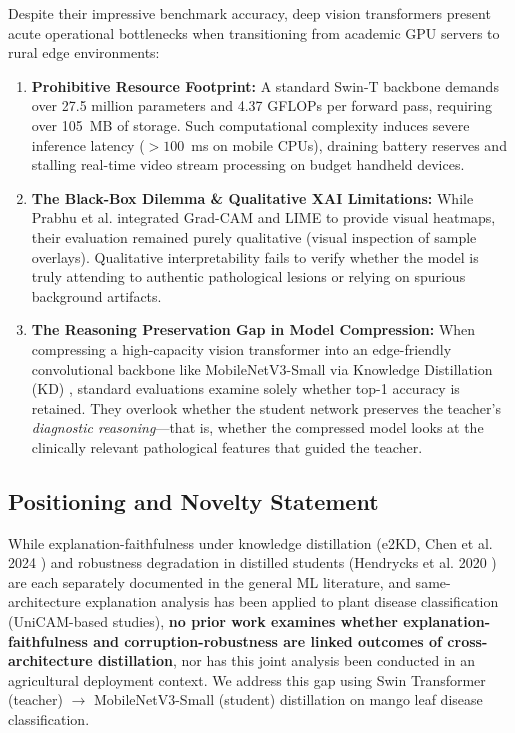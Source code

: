 \documentclass[journal,10pt,twocolumn]{article}
\begin{document}
Despite their impressive benchmark accuracy, deep vision transformers present acute operational bottlenecks when transitioning from academic GPU servers to rural edge environments:
\begin{enumerate}
    \item \textbf{Prohibitive Resource Footprint:} A standard Swin-T backbone demands over 27.5 million parameters and 4.37 GFLOPs per forward pass, requiring over 105~MB of storage. Such computational complexity induces severe inference latency ($>100$~ms on mobile CPUs), draining battery reserves and stalling real-time video stream processing on budget handheld devices.
    \item \textbf{The Black-Box Dilemma & Qualitative XAI Limitations:} While Prabhu et al. \cite{prabhu2025investigation} integrated Grad-CAM \cite{selvaraju2017grad} and LIME \cite{ribeiro2016should} to provide visual heatmaps, their evaluation remained purely qualitative (visual inspection of sample overlays). Qualitative interpretability fails to verify whether the model is truly attending to authentic pathological lesions or relying on spurious background artifacts.
    \item \textbf{The Reasoning Preservation Gap in Model Compression:} When compressing a high-capacity vision transformer into an edge-friendly convolutional backbone like MobileNetV3-Small \cite{howard2019searching} via Knowledge Distillation (KD) \cite{hinton2015distilling}, standard evaluations examine solely whether top-1 accuracy is retained. They overlook whether the student network preserves the teacher's \textit{diagnostic reasoning}---that is, whether the compressed model looks at the clinically relevant pathological features that guided the teacher.
\end{enumerate}

\subsection{Positioning and Novelty Statement}
\label{sec:novelty}

While explanation-faithfulness under knowledge distillation (e2KD, Chen et al. 2024 \cite{chen2024e2kd}) and robustness degradation in distilled students (Hendrycks et al. 2020 \cite{hendrycks2020benchmarking}) are each separately documented in the general ML literature, and same-architecture explanation analysis has been applied to plant disease classification (UniCAM-based studies), \textbf{no prior work examines whether explanation-faithfulness and corruption-robustness are linked outcomes of cross-architecture distillation}, nor has this joint analysis been conducted in an agricultural deployment context. We address this gap using Swin Transformer (teacher) $\rightarrow$ MobileNetV3-Small (student) distillation on mango leaf disease classification.
\end{document}

